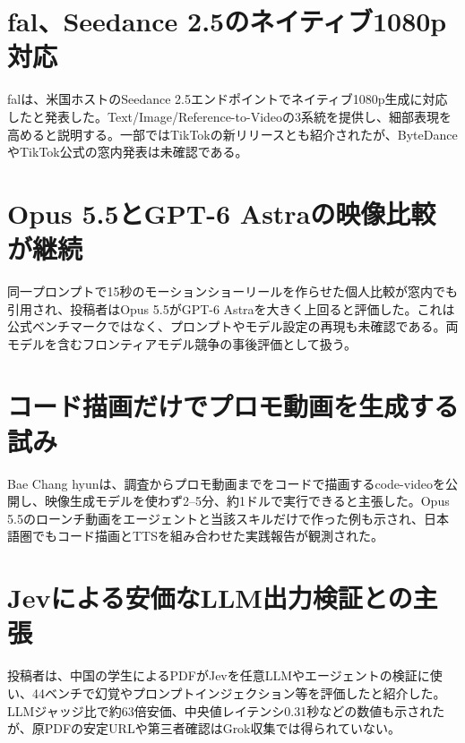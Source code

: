 \section{fal、Seedance 2.5のネイティブ1080p対応}
falは、米国ホストのSeedance 2.5エンドポイントでネイティブ1080p生成に対応したと発表した。Text/Image/Reference-to-Videoの3系統を提供し、細部表現を高めると説明する。一部ではTikTokの新リリースとも紹介されたが、ByteDanceやTikTok公式の窓内発表は未確認である。
\begin{samepage}\end{samepage}

\section{Opus 5.5とGPT-6 Astraの映像比較が継続}
同一プロンプトで15秒のモーションショーリールを作らせた個人比較が窓内でも引用され、投稿者はOpus 5.5がGPT-6 Astraを大きく上回ると評価した。これは公式ベンチマークではなく、プロンプトやモデル設定の再現も未確認である。両モデルを含むフロンティアモデル競争の事後評価として扱う。

\section{コード描画だけでプロモ動画を生成する試み}
Bae Chang hyunは、調査からプロモ動画までをコードで描画するcode-videoを公開し、映像生成モデルを使わず2--5分、約1ドルで実行できると主張した。Opus 5.5のローンチ動画をエージェントと当該スキルだけで作った例も示され、日本語圏でもコード描画とTTSを組み合わせた実践報告が観測された。

\section{Jevによる安価なLLM出力検証との主張}
投稿者は、中国の学生によるPDFがJevを任意LLMやエージェントの検証に使い、44ベンチで幻覚やプロンプトインジェクション等を評価したと紹介した。LLMジャッジ比で約63倍安価、中央値レイテンシ0.31秒などの数値も示されたが、原PDFの安定URLや第三者確認はGrok収集では得られていない。

